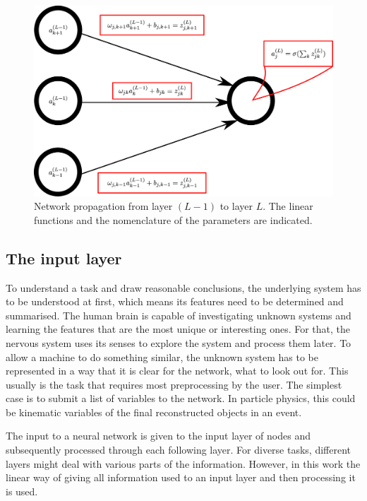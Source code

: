 \begin{figure}[htbp]
	\centering
	\includegraphics[scale=0.18]{figures_ML/nodes_nomenclature.eps}
	\caption[Network parameter nomenclature]{Network propagation from layer $(L-1)$ to layer $L$. The linear functions and the nomenclature of the parameters are indicated.}
	\label{fig:nodes_nomenclature}
\end{figure}


\subsection{The input layer}

To understand a task and draw reasonable conclusions, the underlying system has to be understood at first, which means its features need to be determined and summarised. The human brain is capable of investigating unknown systems and learning the features that are the most unique or interesting ones. For that, the nervous system uses its senses to explore the system and process them later. To allow a machine to do something similar, the unknown system has to be represented in a way that it is clear for the network, what to look out for. This usually is the task that requires most preprocessing by the user. The simplest case is to submit a list of variables to the network. In particle physics, this could be kinematic variables of the final reconstructed objects in an event.

The input to a neural network is given to the input layer of nodes and subsequently processed through each following layer. For diverse tasks, different layers might deal with various parts of the information. However, in this work the linear way of giving all information used to an input layer and then processing it is used.

